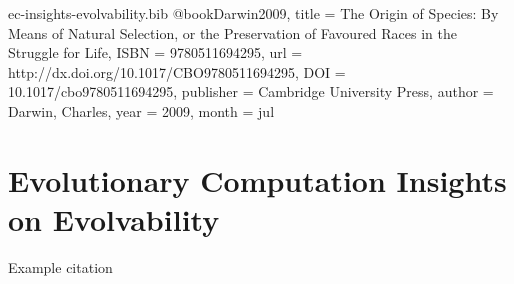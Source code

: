 \begin{bibunit}

\begin{filecontents*}[overwrite]{ec-insights-evolvability.bib}
@book{Darwin2009,
  title = {The Origin of Species: By Means of Natural Selection,  or the Preservation of Favoured Races in the Struggle for Life},
  ISBN = {9780511694295},
  url = {http://dx.doi.org/10.1017/CBO9780511694295},
  DOI = {10.1017/cbo9780511694295},
  publisher = {Cambridge University Press},
  author = {Darwin,  Charles},
  year = {2009},
  month = jul 
}
\end{filecontents*} 

\section{Evolutionary Computation Insights on Evolvability}
\label{sec:ec-coevolution}

Example citation \citep{Darwin2009}

    
\end{bibunit}
